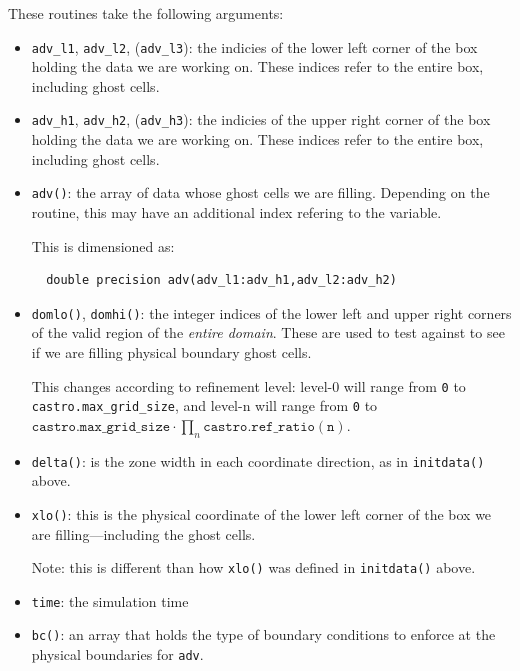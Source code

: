 \begin{itemize}
\begin{itemize}
  \end{itemize}

  These routines take the following arguments:
  \begin{itemize}
  \item {\tt adv\_l1}, {\tt adv\_l2}, ({\tt adv\_l3}): the indicies of
    the lower left corner of the box holding the data we are working on.
    These indices refer to the entire box, including ghost cells.

  \item {\tt adv\_h1}, {\tt adv\_h2}, ({\tt adv\_h3}): the indicies of
    the upper right corner of the box holding the data we are working on.
    These indices refer to the entire box, including ghost cells.

  \item {\tt adv()}: the array of data whose ghost cells we are filling.
    Depending on the routine, this may have an additional index refering
    to the variable.

    This is dimensioned as:
\begin{verbatim}
  double precision adv(adv_l1:adv_h1,adv_l2:adv_h2)
\end{verbatim}

  \item {\tt domlo()}, {\tt domhi()}: the integer indices of the lower
    left and upper right corners of the valid region of the {\em entire
    domain}.  These are used to test against to see if we are filling
    physical boundary ghost cells.

    This changes according to refinement level: level-0 will
    range from {\tt 0} to {\tt castro.max\_grid\_size},
    and level-n will range from {\tt 0} to
    $\mathtt{castro.max\_grid\_size} \cdot \prod_n \mathtt{castro.ref\_ratio(n)}$.

  \item {\tt delta()}: is the zone width in each coordinate direction,
    as in {\tt initdata()} above.

  \item {\tt xlo()}: this is the physical coordinate of the lower
    left corner of the box we are filling---including the ghost cells.

    Note: this is different than how {\tt xlo()} was defined in
    {\tt initdata()} above.

  \item {\tt time}: the simulation time

  \item {\tt bc()}: an array that holds the type of boundary conditions
    to enforce at the physical boundaries for {\tt adv}.


\end{itemize}
\end{itemize}
